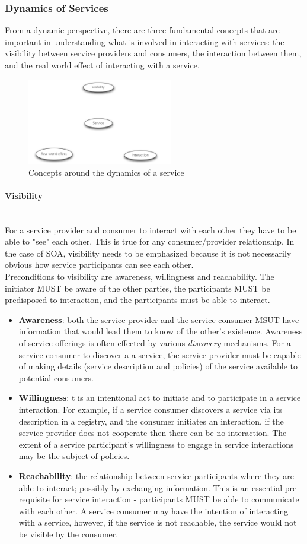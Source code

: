 \documentclass[10pt,a4paper]{article}
\newcommand{\myparagraph}[1]{\paragraph{\uline{#1}}\mbox{}\\[0.05in]}
\begin{document}
\subsubsection{Dynamics of Services}
From a dynamic perspective, there are three fundamental concepts that are important in understanding what is involved in interacting with services: the visibility between service providers and consumers, the interaction between them, and the real world effect of interacting with a service.
\begin{figure}[h!]
 \hfill \includegraphics[width=180pt]{images/dynamics-services}\hspace*{\fill}
  \caption{Concepts around the dynamics of a service}
  \label{fig:dynamics}
\end{figure} 
\myparagraph{Visibility}
 For a service provider and consumer to interact with each other they have to be able to "see" each other. This is true for any consumer/provider relationship. In the case of SOA, visibility needs to be emphasized because it is not necessarily obvious how service participants can see each other. \\
 Preconditions to visibility are awareness, willingness and reachability. The initiator MUST be aware of the other parties, the participants MUST be predisposed to interaction, and the participants must be able to interact.
 \begin{itemize}
 	\item \textbf{Awareness}: both the service provider and the service consumer MSUT have information that would lead them to know of the other's existence. Awareness of service offerings is often effected by various \textit{discovery} mechanisms. For a service consumer to discover a a service, the service provider must be capable of making details (service description and policies) of the service available to potential consumers.
 	\item \textbf{Willingness}: t is an intentional act to initiate and to participate in a service interaction. For example, if a service consumer discovers a service via its description in a registry, and the consumer initiates an interaction, if the service provider does not cooperate then there can be no interaction. The extent of a service participant's willingness to engage in service interactions may be the subject of policies. 
 	\item \textbf{Reachability}: the relationship between service participants where they are able to interact; possibly by exchanging information. This is an essential pre-requisite for service interaction - participants MUST be able to communicate with each other. A service consumer may have the intention of interacting with a service, however, if the service is not reachable, the service would not be visible by the consumer.
 \end{itemize}
\end{document}
